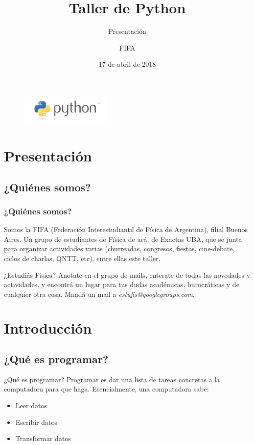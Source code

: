 \documentclass{beamer}
\title{Taller de Python}
\subtitle{Presentación}
\author{FIFA}
\institute[FIFA]{Federación Interestudiantil de Física Argentina}
\date{17 de abril de 2018}
\begin{document}
\begin{frame}
  \titlepage
  
    \begin{figure}
    \centering
    \includegraphics[width=0.4\textwidth]{fig/python-logo.png}
    \end{figure}

\end{frame}


\section{Presentación}

\subsection{¿Quiénes somos?}
\begin{frame}
\frametitle{¿Quiénes somos?}
    Somos la FIFA (Federación Interestudiantil de Física de Argentina),
filial Buenos Aires. Un grupo de estudiantes de Física de acá, de
Exactas UBA, que se junta para organizar actividades varias
(churreadas, congresos, fiestas, cine-debate, ciclos de charlas,
QNTT, etc), entre ellas este taller.
\end{frame}

\begin{frame}
¿Estudiás Física? Anotate en el grupo de mails, enterate de todas
las novedades y actividades, y encontrá un lugar para tus dudas
académicas, burocráticas y de cualquier otra cosa.
Mandá un mail a \textit{estufis@googlegroups.com}.
    
\end{frame}

\section{Introducción}
\subsection{¿Qué es programar?}
\begin{frame}{¿Qué es programar?}
    Programar es dar una lista de tareas concretas a la computadora
para que haga. Esencialmente, una computadora sabe:
\begin{itemize}
    \item Leer datos
    \item Escribir datos
    \item Transformar datos
\end{itemize}
\end{frame}
\end{document}
